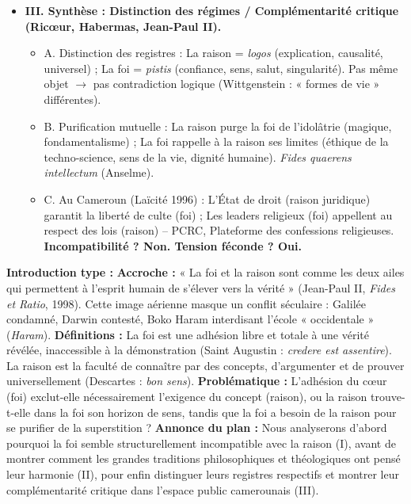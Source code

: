 \documentclass[11pt]{article}
\newcommand{\cle}[1]{{\popxbold\color{popdark}#1}}
\begin{document}
\begin{exoresolu}
\begin{itemize}
\begin{itemize}
    \end{itemize}
    \item \textbf{III. Synthèse : Distinction des régimes / Complémentarité critique (Ricœur, Habermas, Jean-Paul II).}
    \begin{itemize}
        \item A. Distinction des \cle{registres} : La raison = \emph{logos} (explication, causalité, universel) ; La foi = \emph{pistis} (confiance, sens, salut, singularité). Pas même objet $\rightarrow$ pas contradiction logique (Wittgenstein : « formes de vie » différentes).
        \item B. \cle{Purification mutuelle} : La raison purge la foi de l'idolâtrie (magique, fondamentalisme) ; La foi rappelle à la raison ses limites (éthique de la techno-science, sens de la vie, dignité humaine). \emph{Fides quaerens intellectum} (Anselme).
        \item C. Au Cameroun (Laïcité 1996) : L'État de droit (raison juridique) garantit la liberté de culte (foi) ; Les leaders religieux (foi) appellent au respect des lois (raison) -- PCRC, Plateforme des confessions religieuses. \textbf{Incompatibilité ? Non. Tension féconde ? Oui.}
    \end{itemize}
\end{itemize}
\textbf{Introduction type :}
\textbf{Accroche :} « La foi et la raison sont comme les deux ailes qui permettent à l'esprit humain de s'élever vers la vérité » (Jean-Paul II, \emph{Fides et Ratio}, 1998). Cette image aérienne masque un conflit séculaire : Galilée condamné, Darwin contesté, Boko Haram interdisant l'école « occidentale » (\emph{Haram}).
\textbf{Définitions :} La \cle{foi} est une adhésion libre et totale à une vérité révélée, inaccessible à la démonstration (Saint Augustin : \emph{credere est assentire}). La \cle{raison} est la faculté de connaître par des concepts, d'argumenter et de prouver universellement (Descartes : \emph{bon sens}).
\textbf{Problématique :} L'adhésion du cœur (foi) exclut-elle nécessairement l'exigence du concept (raison), ou la raison trouve-t-elle dans la foi son horizon de sens, tandis que la foi a besoin de la raison pour se purifier de la superstition ?
\textbf{Annonce du plan :} Nous analyserons d'abord pourquoi la foi semble structurellement incompatible avec la raison (I), avant de montrer comment les grandes traditions philosophiques et théologiques ont pensé leur harmonie (II), pour enfin distinguer leurs registres respectifs et montrer leur complémentarité critique dans l'espace public camerounais (III).
\end{exoresolu}
\end{document}
